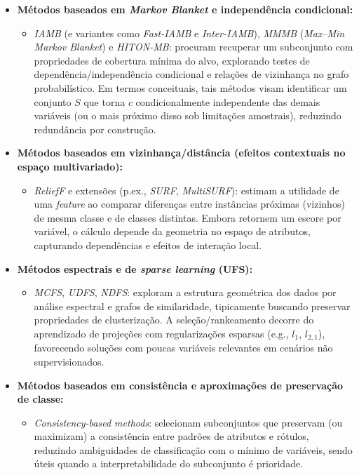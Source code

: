 \begin{itemize}
    \item \textbf{Métodos baseados em \emph{Markov Blanket} e independência condicional:}
    \begin{itemize}
        \item \emph{IAMB} (e variantes como \emph{Fast-IAMB} e \emph{Inter-IAMB}), \emph{MMMB} (\emph{Max--Min Markov Blanket}) e \emph{HITON-MB}: procuram recuperar um subconjunto com propriedades de cobertura mínima do alvo, explorando testes de dependência/independência condicional e relações de vizinhança no grafo probabilístico. Em termos conceituais, tais métodos visam identificar um conjunto $S$ que torna $c$ condicionalmente independente das demais variáveis (ou o mais próximo disso sob limitações amostrais), reduzindo redundância por construção. \cite{Theng2024,Dhal2022}
    \end{itemize}

    \item \textbf{Métodos baseados em vizinhança/distância (efeitos contextuais no espaço multivariado):}
    \begin{itemize}
        \item \emph{ReliefF} e extensões (p.ex., \emph{SURF}, \emph{MultiSURF}): estimam a utilidade de uma \emph{feature} ao comparar diferenças entre instâncias próximas (vizinhos) de mesma classe e de classes distintas. Embora retornem um escore por variável, o cálculo depende da geometria no espaço de atributos, capturando dependências e efeitos de interação local. \cite{Theng2024,Dhal2022}
    \end{itemize}

    \item \textbf{Métodos espectrais e de \emph{sparse learning} (UFS):}
    \begin{itemize}
        \item \emph{MCFS}, \emph{UDFS}, \emph{NDFS}: exploram a estrutura geométrica dos dados por análise espectral e grafos de similaridade, tipicamente buscando preservar propriedades de clusterização. A seleção/rankeamento decorre do aprendizado de projeções com regularizações esparsas (e.g., $l_1$, $l_{2,1}$), favorecendo soluções com poucas variáveis relevantes em cenários não supervisionados. \cite{SolorioFernandez2020}
    \end{itemize}

    \item \textbf{Métodos baseados em consistência e aproximações de preservação de classe:}
    \begin{itemize}
        \item \emph{Consistency-based methods}: selecionam subconjuntos que preservam (ou maximizam) a consistência entre padrões de atributos e rótulos, reduzindo ambiguidades de classificação com o mínimo de variáveis, sendo úteis quando a interpretabilidade do subconjunto é prioridade. \cite{Theng2024,Dhal2022,EBRAHIMIWARKIANI2025129372}
    \end{itemize}


\end{itemize}

